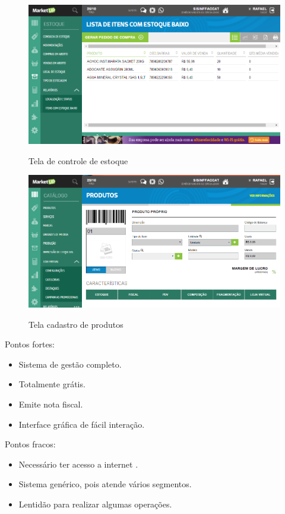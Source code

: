 \begin{figure}[htp]
\centering
\caption{Tela de controle de estoque}
\includegraphics[width=15cm]{imagens/estoque-MarktUP.png}
\label{fig:ControleEstoqueMarketUP}
\end{figure}

\begin{figure}[htp]
\centering
\caption{Tela cadastro de produtos}
\includegraphics[width=16cm]{imagens/CadProdMark.png}
\label{fig:CadastroProdutoMarketUP}
\end{figure}


Pontos fortes: 
\begin{itemize}
            \item Sistema de gestão completo.
            \item Totalmente grátis.
            \item Emite nota fiscal.
            \item Interface gráfica de fácil interação.
 \end{itemize}
                
Pontos fracos: 
\begin{itemize}
    \item Necessário ter acesso a internet .
    \item Sistema genérico, pois atende vários segmentos.
    \item Lentidão para realizar algumas operações.
\end{itemize}
            
